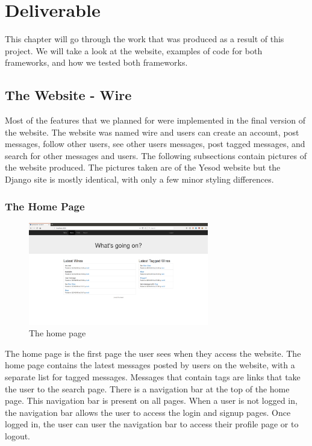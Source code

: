 \chapter{Deliverable}
\label{chap:Deliverable}

This chapter will go through the work that was produced as a result of this
project. We will take a look at the website, examples of code for both frameworks,
and how we tested both frameworks.

\section{The Website - Wire}

Most of the features that we planned for were implemented in the final version
of the website. The website was named wire and users can create an account,
post messages, follow other users, see other users messages, post tagged
messages, and search for other messages and users. The following subsections
contain pictures of the website produced. The pictures taken are of the Yesod
website but the Django site is mostly identical, with only a few minor styling
differences.

\subsection{The Home Page}

\begin{figure}[H]
    \centering
    \includegraphics[width=0.7\textwidth]{final_report/pics/home.png}
    \caption{The home page}
    \label{fig:wireHome}
\end{figure}

The home page is the first page the user sees when they access the website.
The home page contains the latest messages posted by users on the website,
with a separate list for tagged messages. Messages that contain tags are links
that take the user to the search page. There is a navigation bar at the top of
the home page. This navigation bar is present on all pages. When a user is not
logged in, the navigation bar allows the user to access the login and signup pages.
Once logged in, the user can user the navigation bar to access their profile page
or to logout.

